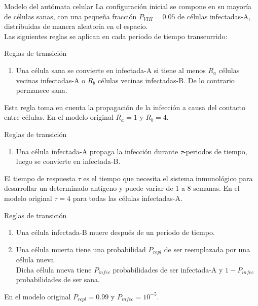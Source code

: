 \documentclass[12pt, compress, titleprogressbar]{beamer}
\begin{document}
	\begin{frame}{Modelo del autómata celular}
		La configuración inicial se compone en su mayoría de células sanas, con una pequeña fracción $P_{VIH}=0.05$ de células infectadas-A, distribuidas de manera aleatoria en el espacio.\\

		Las siguientes reglas se aplican en cada periodo de tiempo transcurrido:
	\end{frame}

	\begin{frame}{Reglas de transición}
		\begin{enumerate}
			\item Una célula sana se convierte en infectada-A si tiene al menos $R_a$ células vecinas infectadas-A o $R_b$ células vecinas infectadas-B. De lo contrario permanece sana.
		\end{enumerate}

		Esta regla toma en cuenta la propagación de la infección a causa del contacto entre células. En el modelo original $R_a = 1$ y $R_b = 4$.
	\end{frame}

	\begin{frame}{Reglas de transición}
		\begin{enumerate}[start=2]
			\item Una célula infectada-A propaga la infección durante $\tau$-periodos de tiempo, luego se convierte en infectada-B.
		\end{enumerate}

		El tiempo de respuesta $\tau$ es el tiempo que necesita el sistema inmunológico para desarrollar un determinado antígeno y puede variar de 1 a 8 semanas. En el modelo original $\tau = 4$ para todas las células infectadas-A.
	\end{frame}

	\begin{frame}{Reglas de transición}
		\begin{enumerate}[start=3]
			\item Una célula infectada-B muere después de un periodo de tiempo.
			\item Una célula muerta tiene una probabilidad $P_{repl}$ de ser reemplazada por una célula nueva.\\
			Dicha célula nueva tiene $P_{infec}$ probabilidades de ser infectada-A y $1 - P_{infec}$ probabilidades de ser sana.
		\end{enumerate}

		En el modelo original $P_{repl} = 0.99$ y $P_{infec} = 10^{-5}$.
	\end{frame}
\end{document}

